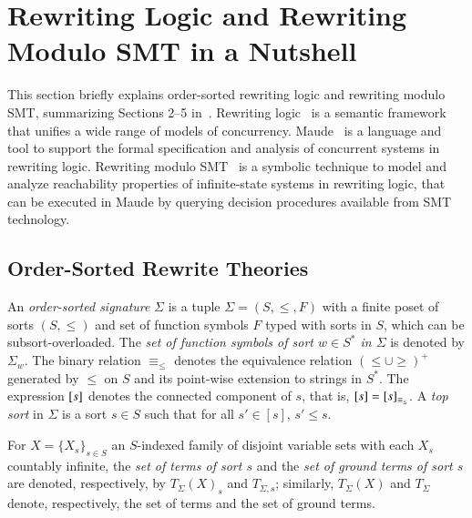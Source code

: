 
\section{Rewriting Logic and Rewriting Modulo SMT in a Nutshell}
\label{sec.rewsmt}

This section briefly explains  order-sorted rewriting logic and rewriting
modulo SMT, summarizing Sections 2--5
in~\cite{rocha-rewsmtjlamp-2017}.  Rewriting
logic~\cite{meseguer-rltcs-1992} is a semantic framework that unifies
a wide range of models of concurrency. 
Maude~\cite{clavel-maudebook-2007} is a language and tool to support 
the formal specification and analysis of concurrent systems in rewriting logic.
%
Rewriting modulo SMT~\cite{rocha-rewsmtjlamp-2017} is a
symbolic technique to model and analyze reachability properties of
infinite-state systems in rewriting logic, that can %
be executed
in Maude by querying decision procedures available from SMT
technology.

\subsection{Order-Sorted Rewrite Theories}

An \emph{order-sorted signature} $\Sigma$
is a tuple $\Sigma {=}(S,\leq,F)$ with a finite poset of sorts
$(S,\leq)$ and set of function symbols $F$ typed with sorts in $S$,
which can be subsort-overloaded. The \emph{set of function symbols of
  sort $w \in S^*$ in $\Sigma$} is denoted by $\Sigma_w$. 
%
The binary
relation $\equiv_\leq$ denotes the equivalence relation
$(\leq\cup\geq)^+$ generated by $\leq$ on $S$ and its point-wise
extension to strings in $S^*$. 
The expression
$\left[s\right]$ denotes the connected component of $s$, that is, $\left[s\right]
= \left[s\right]_{\equiv_\leq}$.  
A {\em top sort} in $\Sigma$ is a sort $s
\in S$ such that for all $s' \in [s]$, $s' \leq s$.  

For $X =
\{X_s\}_{s\in S}$ an $S$-indexed family of disjoint variable sets with
each $X_s$ countably infinite, the {\em set of terms of sort $s$} and
the {\em set of ground terms of sort $s$} are denoted, respectively,
by $T_\Sigma(X)_s$ and $T_{\Sigma,s}$; similarly, $T_\Sigma(X)$ and
$T_\Sigma$ denote, respectively, the set of terms and the set of
ground terms. 

